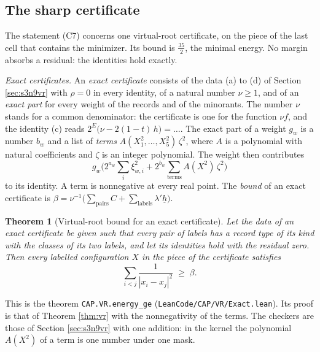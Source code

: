 \documentclass[reqno,a4paper,11pt]{amsart}
\numberwithin{equation}{section}
\newtheorem{theorem}{Theorem}[section]
\newcommand{\lean}[1]{\texttt{#1}}
\newcommand{\file}[1]{\nolinkurl{#1}}
\begin{document}
\subsection{The sharp certificate}\label{sec:s3n9sharp}

The statement (C7) concerns one virtual-root certificate, on the piece of the last cell that contains the minimizer. Its bound is $\tfrac{35}{2}$, the minimal energy. No margin absorbs a residual: the identities hold exactly.

\emph{Exact certificates.} An \emph{exact certificate} consists of the data (a) to (d) of Section \ref{sec:s3n9vr} with $\rho = 0$ in every identity, of a natural number $\nu \geq 1$, and of an \emph{exact part} for every weight of the records and of the minorants. The number $\nu$ stands for a common denominator: the certificate is one for the function $\nu f$, and the identity (c) reads $2^E \big( \nu - 2 (1 - t) \, h \big) = \dots$. The exact part of a weight $g_w$ is a number $b_w$ and a list of \emph{terms} $A(X_1^2, \dots, X_5^2) \, \zeta^2$, where $A$ is a polynomial with natural coefficients and $\zeta$ is an integer polynomial. The weight then contributes
$$
g_w \Big( 2^{a_w} \sum_i \xi_{w,i}^2 + 2^{b_w} \sum_{\text{terms}} A(X^2) \, \zeta^2 \Big)
$$
to its identity. A term is nonnegative at every real point. The \emph{bound} of an exact certificate is $\beta = \nu^{-1} \big( \sum_{\text{pairs}} C + \sum_{\text{labels}} \lambda' \underline h \big)$.

\begin{theorem}[Virtual-root bound for an exact certificate]\label{thm:vrexact}
Let the data of an exact certificate be given such that every pair of labels has a record type of its kind with the classes of its two labels, and let its identities hold with the residual zero. Then every labelled configuration $X$ in the piece of the certificate satisfies
$$
\sum_{i<j} \frac{1}{|x_i - x_j|^2} \;\geq\; \beta .
$$
\end{theorem}

This is the theorem \lean{CAP.VR.energy\_ge} (\file{LeanCode/CAP/VR/Exact.lean}). Its proof is that of Theorem \ref{thm:vr} with the nonnegativity of the terms. The checkers are those of Section \ref{sec:s3n9vr} with one addition: in the kernel the polynomial $A(X^2)$ of a term is one number under one mask.
\end{document}
